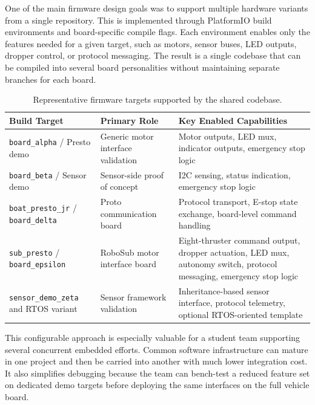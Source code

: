\documentclass[conference]{IEEEtran}
\begin{document}
One of the main firmware design goals was to support multiple hardware variants from a single repository. This is implemented through PlatformIO build environments and board-specific compile flags. Each environment enables only the features needed for a given target, such as motors, sensor buses, LED outputs, dropper control, or protocol messaging. The result is a single codebase that can be compiled into several board personalities without maintaining separate branches for each board.

\begin{table}[htbp]
\caption{Representative firmware targets supported by the shared codebase.}
\label{tab:firmware_targets}
\begin{center}
\begin{tabularx}{\columnwidth}{|p{}|p{}|X|}
\hline
\textbf{Build Target} & \textbf{Primary Role} & \textbf{Key Enabled Capabilities} \\
\hline
\texttt{board\_alpha} / Presto demo & Generic motor interface validation & Motor outputs, LED mux, indicator outputs, emergency stop logic \\
\hline
\texttt{board\_beta} / Sensor demo & Sensor-side proof of concept & I2C sensing, status indication, emergency stop logic \\
\hline
\texttt{boat\_presto\_jr} / \texttt{board\_delta} & Proto communication board & Protocol transport, E-stop state exchange, board-level command handling \\
\hline
\texttt{sub\_presto} / \texttt{board\_epsilon} & RoboSub motor interface board & Eight-thruster command output, dropper actuation, LED mux, autonomy switch, protocol messaging, emergency stop logic \\
\hline
\texttt{sensor\_demo\_zeta} and RTOS variant & Sensor framework validation & Inheritance-based sensor interface, protocol telemetry, optional RTOS-oriented template \\
\hline
\end{tabularx}
\end{center}
\end{table}

This configurable approach is especially valuable for a student team supporting several concurrent embedded efforts. Common software infrastructure can mature in one project and then be carried into another with much lower integration cost. It also simplifies debugging because the team can bench-test a reduced feature set on dedicated demo targets before deploying the same interfaces on the full vehicle board.
\end{document}
